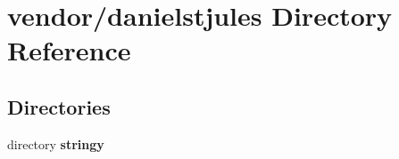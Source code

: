 \section{vendor/danielstjules Directory Reference}
\label{dir_4fcee0029009a2a9a694c8fc43f307f0}
\subsection*{Directories}
\begin{DoxyCompactItemize}
\item 
directory {\bf stringy}
\end{DoxyCompactItemize}
